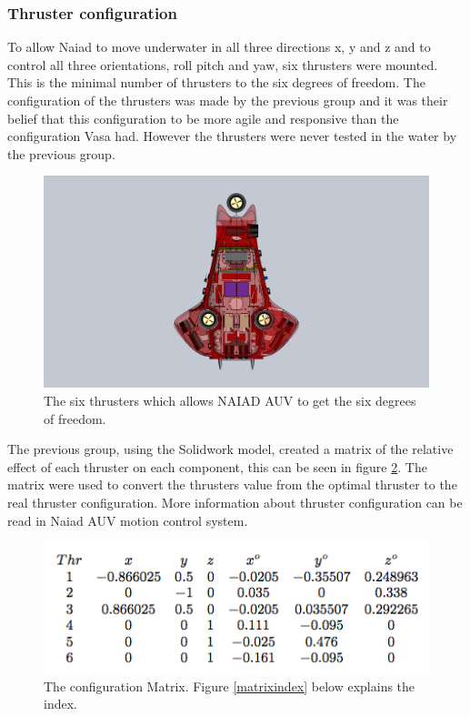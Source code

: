 	\subsubsection{Thruster configuration} %

	
To allow Naiad to move underwater in all three directions x, y and z and to control all three orientations, roll pitch and yaw, six thrusters were mounted. This is the minimal number of thrusters to the six degrees of freedom. The configuration of the thrusters was made by the previous group and it was their belief that this configuration to be more agile and responsive than the configuration Vasa had. However the thrusters were never tested in the water by the previous group.

	\begin{figure}[!ht]
	\begin{center}
		\includegraphics[width=120mm]{./images/mechanics/thcon.png}
		\caption{The six thrusters which allows NAIAD AUV to get the six degrees of freedom.}
		\label{thcon}
	\end{center}
\end{figure}

The previous group, using the Solidwork model, created a matrix of the relative effect of each thruster on each component, this can be seen in figure \ref{matrix}. The matrix were used to convert the thrusters value from the optimal thruster to the real thruster configuration. More information about thruster configuration  can be read in Naiad AUV motion control system.

	\begin{figure}[!ht]
	\begin{center}
		\includegraphics[width=120mm]{./images/mechanics/matrix.png}
		\caption{The configuration Matrix. Figure \ref{matrixindex} below explains the index.}
		\label{matrix}
	\end{center}
	\end{figure}

